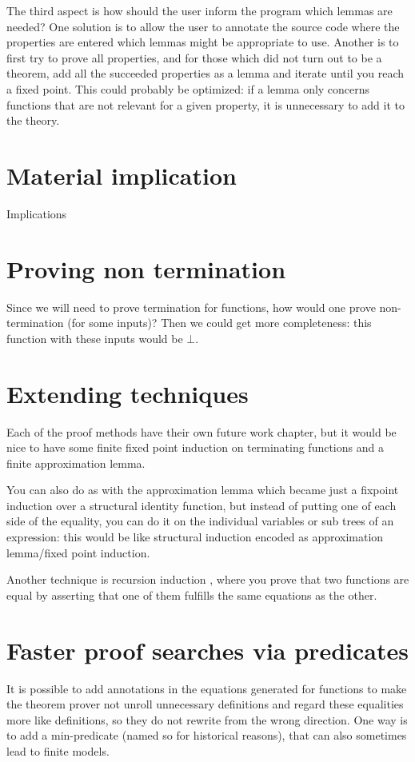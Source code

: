 The third aspect is how should the user inform the program which
lemmas are needed? One solution is to allow the user to annotate the
source code where the properties are entered which lemmas might be
appropriate to use. Another is to first try to prove all properties,
and for those which did not turn out to be a theorem, add all the
succeeded properties as a lemma and iterate until you reach a fixed
point. This could probably be optimized: if a lemma only concerns
functions that are not relevant for a given property, it is
unnecessary to add it to the theory.

\section{Material implication}

Implications

\section{Proving non termination}

Since we will need to prove termination for functions, how would one
prove non-termination (for some inputs)? Then we could get more
completeness: this function with these inputs would be $\bot$.

\section{Extending techniques}

Each of the proof methods have their own future work chapter, but it
would be nice to have some finite fixed point induction on terminating
functions and a finite approximation lemma.

You can also do as with the approximation lemma which became just a
fixpoint induction over a structural identity function, but instead of
putting one of each side of the equality, you can do it on the
individual variables or sub trees of an expression: this would be like
structural induction encoded as approximation lemma/fixed point induction.

Another technique is recursion induction \cite{recind}, where you
prove that two functions are equal by asserting that one of them
fulfills the same equations as the other.


\section{Faster proof searches via predicates}

It is possible to add annotations in the equations generated for
functions to make the theorem prover not unroll unnecessary
definitions and regard these equalities more like definitions, so they
do not rewrite from the wrong direction. One way is to add a
min-predicate (named so for historical reasons), that can also
sometimes lead to finite models.

